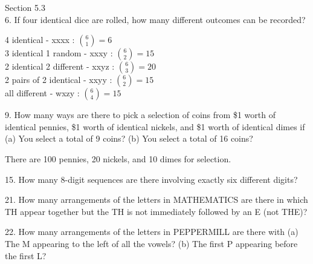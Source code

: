 \documentclass[12pt]{article}
\begin{document}
Section 5.3 \\
6. If four identical dice are rolled, how many different outcomes can 
be recorded?
\begin{solution}
    4 identical - xxxx : $\binom{6}{1} = 6$ \\
    3 identical 1 random - xxxy : $\binom{6}{2} = 15$\\
    2 identical 2 different - xxyz : $\binom{6}{3} = 20$\\
    2 pairs of 2 identical - xxyy : $\binom{6}{2} = 15$\\
    all different - wxzy : $\binom{6}{4} = 15$\\
    
\end{solution}
9. How many ways are there to pick a selection of coins from \$1 worth 
of identical pennies, \$1 worth of identical nickels, and \$1 worth of 
identical dimes if
(a) You select a total of 9 coins?
(b) You select a total of 16 coins?
\begin{solution}
    There are 100 pennies, 20 nickels, and 10 dimes for selection. 
\end{solution}
15. How many 8-digit sequences are there involving exactly six 
different digits?
\begin{solution}
    
\end{solution}
21. How many arrangements of the letters in MATHEMATICS are there in which
TH appear together but the TH is not immediately followed by an E (not THE)?
\begin{solution}
    
\end{solution}
22. How many arrangements of the letters in PEPPERMILL are there with
(a) The M appearing to the left of all the vowels?
(b) The first P appearing before the first L?
\end{document}

